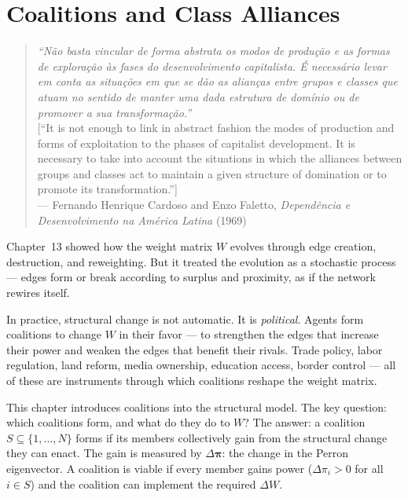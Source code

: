 \documentclass[../structural_economics_book.tex]{subfiles}
\begin{document}
\ifSubfilesClassLoaded{\setcounter{chapter}{13}}{}
\chapter{Coalitions and Class Alliances}\label{ch:14}
\begin{quote}
\textit{``N\~{a}o basta vincular de forma abstrata os modos de produ\c{c}\~{a}o e as formas de explora\c{c}\~{a}o \`{a}s fases do desenvolvimento capitalista. \'{E} necess\'{a}rio levar em conta as situa\c{c}\~{o}es em que se d\~{a}o as alian\c{c}as entre grupos e classes que atuam no sentido de manter uma dada estrutura de dom\'{i}nio ou de promover a sua transforma\c{c}\~{a}o.''}\\[0.3em]
\textnormal{[``It is not enough to link in abstract fashion the modes of production and forms of exploitation to the phases of capitalist development. It is necessary to take into account the situations in which the alliances between groups and classes act to maintain a given structure of domination or to promote its transformation.'']}\\
\hfill --- Fernando Henrique Cardoso and Enzo Faletto, \textit{Depend\^{e}ncia e Desenvolvimento na Am\'{e}rica Latina} (1969)
\end{quote}
\nocite{cardoso1969dependencia,cardoso1970dependencia}

\vspace{1em}

Chapter~13 showed how the weight matrix $W$ evolves through edge creation, destruction, and reweighting. But it treated the evolution as a stochastic process --- edges form or break according to surplus and proximity, as if the network rewires itself.

In practice, structural change is not automatic. It is \textit{political}. Agents form coalitions to change $W$ in their favor --- to strengthen the edges that increase their power and weaken the edges that benefit their rivals. Trade policy, labor regulation, land reform, media ownership, education access, border control --- all of these are instruments through which coalitions reshape the weight matrix.

This chapter introduces coalitions into the structural model. The key question: which coalitions form, and what do they do to $W$? The answer: a coalition $S \subseteq \{1, \ldots, N\}$ forms if its members collectively gain from the structural change they can enact. The gain is measured by $\Delta\boldsymbol{\pi}$: the change in the Perron eigenvector. A coalition is viable if every member gains power ($\Delta\pi_i > 0$ for all $i \in S$) and the coalition can implement the required $\Delta W$.
\end{document}
